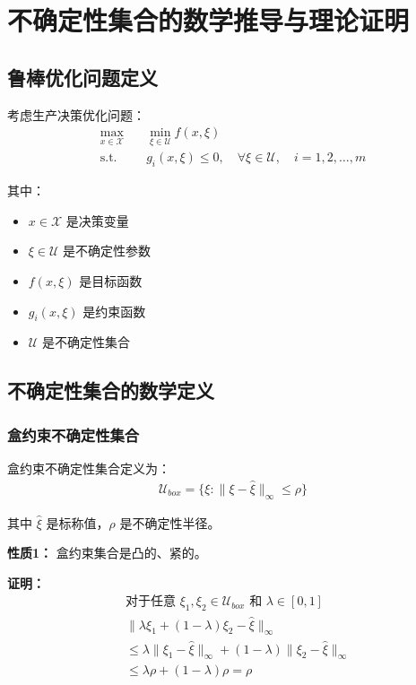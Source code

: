 
\section{不确定性集合的数学推导与理论证明}

\subsection{鲁棒优化问题定义}

考虑生产决策优化问题：
\begin{align}
\max_{x \in \mathcal{X}} \quad & \min_{\xi \in \mathcal{U}} f(x, \xi) \\
\text{s.t.} \quad & g_i(x, \xi) \leq 0, \quad \forall \xi \in \mathcal{U}, \quad i = 1, 2, \ldots, m
\end{align}

其中：
\begin{itemize}
\item $x \in \mathcal{X}$ 是决策变量
\item $\xi \in \mathcal{U}$ 是不确定性参数
\item $f(x, \xi)$ 是目标函数
\item $g_i(x, \xi)$ 是约束函数
\item $\mathcal{U}$ 是不确定性集合
\end{itemize}

\subsection{不确定性集合的数学定义}

\subsubsection{盒约束不确定性集合}

盒约束不确定性集合定义为：
\begin{align}
\mathcal{U}_{box} = \{\xi : \|\xi - \hat{\xi}\|_{\infty} \leq \rho\}
\end{align}

其中 $\hat{\xi}$ 是标称值，$\rho$ 是不确定性半径。

\textbf{性质1：} 盒约束集合是凸的、紧的。

\textbf{证明：} 
\begin{align}
& \text{对于任意 } \xi_1, \xi_2 \in \mathcal{U}_{box} \text{ 和 } \lambda \in [0, 1] \\
& \|\lambda \xi_1 + (1-\lambda) \xi_2 - \hat{\xi}\|_{\infty} \\
& \leq \lambda \|\xi_1 - \hat{\xi}\|_{\infty} + (1-\lambda) \|\xi_2 - \hat{\xi}\|_{\infty} \\
& \leq \lambda \rho + (1-\lambda) \rho = \rho
\end{align}

